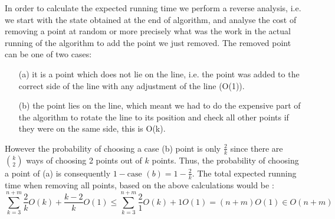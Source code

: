 In order to calculate the expected running time we perform a reverse analysis, i.e. we start with the state obtained at the end of algorithm, and analyse the cost of removing a point at random or more precisely what was the work in the actual running of the algorithm to add the point we just removed. The removed point can be one of two cases: \begin{enumerate}
	\item[(a)] it is a point which does not lie on the line, i.e. the point was added
to the correct side of the line with any adjustment of the line (O(1)).
\item[(b)] the point lies on the line, which meant we had to do the expensive part of the algorithm to rotate the line to its position and check all other points if they were on the same side, this is O(k).
\end{enumerate}
However the probability of choosing a case (b) point is only $\frac{2}{k}$ since there are $\binom{k}{2}$ ways of choosing 2 points out of $k$ points. Thus, the probability of choosing a point of (a) is consequently $1-\text{case } (b) = 1 - \frac{2}{k}$. The total expected running time when removing all points, based on the above calculations would be : $$\sum^{n+m}_{k=3}{\frac{2}{k}O(k)+\frac{k-2}{k}O(1)}\leq\sum^{n+m}_{k=3}{\frac{2}{1}O(k)+1O(1)}=(n+m)O(1)\in O(n+m)$$